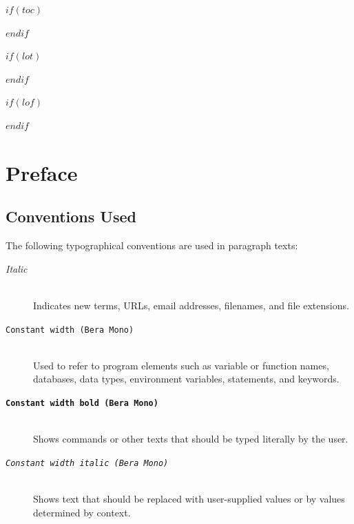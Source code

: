 \documentclass[
    $if(fontsize)$$fontsize$$else$10pt$endif$,
    $if(papersize)$$papersize$$else$letterpaper$endif$,
    titlepage,
    oneside,
    openright,
    $if(draft)$draft$else$final$endif$,
    article]{memoir}
\begin{document}
\cleardoublepage

%
%
$if(toc)$
{
    \cleardoublepage
    \begin{KeepFromToc} %
        \tableofcontents
    \end{KeepFromToc}
    \pagebreak
    \cleardoublepage
}
$endif$

$if(lot)$
    \listoftables
$endif$

$if(lof)$
    \listoffigures
$endif$



\pagebreak
\cleardoublepage



\chapter*{Preface}

\hypertarget{conventions}{%
\section{Conventions Used}\label{conventions}}

The following typographical conventions are used in paragraph texts:

\begin{description}

\item[\textnormal{\textit{Italic}}]\hfill \\
Indicates new terms, URLs, email addresses, filenames, and file
extensions.

\item[\textnormal{\texttt{Constant width (Bera Mono)}}]\hfill \\
Used to refer to program elements such as variable or function names,
databases, data types, environment variables, statements, and
keywords.

\item[\textbf{\texttt{Constant width bold (Bera Mono)}}]\hfill \\
Shows commands or other texts that should be typed literally by the
user.

\item[\textnormal{\texttt{\textit{Constant width italic (Bera Mono)}}}]\hfill \\
Shows text that should be replaced with user-supplied values or by
values determined by context.
\end{description}
\end{document}
